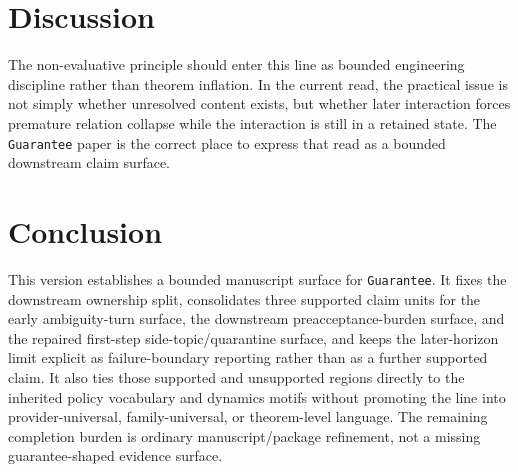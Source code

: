 \documentclass[11pt]{article}
\begin{document}
\section{Discussion}

The non-evaluative principle should enter this line as bounded engineering
discipline rather than theorem inflation. In the current read, the practical issue
is not simply whether unresolved content exists, but whether later interaction
forces premature relation collapse while the interaction is still in a retained
state. The \texttt{Guarantee} paper is the correct place to express that read as
a bounded downstream claim surface.

\section{Conclusion}

This version establishes a bounded manuscript surface for \texttt{Guarantee}.
It fixes the downstream ownership split, consolidates three
supported claim units for the early ambiguity-turn surface, the downstream
preacceptance-burden surface, and the repaired first-step side-topic/quarantine
surface, and keeps the later-horizon limit explicit as failure-boundary
reporting rather than as a further supported claim. It also ties those
supported and unsupported regions directly to the inherited policy vocabulary
and dynamics motifs without promoting the line into provider-universal,
family-universal, or theorem-level language. The remaining completion burden is
ordinary manuscript/package refinement, not a missing guarantee-shaped evidence
surface.
\end{document}
